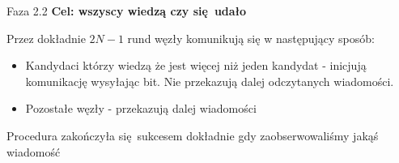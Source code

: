 \begin{frame}{Faza 2.2}
    \textbf{Cel: wszyscy wiedzą czy się udało} 

    \pause
    Przez dokładnie $2N-1$ rund węzły komunikują się w następujący sposób:
    \begin{itemize}
        \item Kandydaci którzy wiedzą że jest więcej niż jeden kandydat - inicjują komunikację wysyłając bit. Nie przekazują dalej odczytanych wiadomości.
        \item Pozostałe węzły - przekazują dalej wiadomości
    \end{itemize}
    \pause 
    Procedura zakończyła się sukcesem dokładnie gdy zaobserwowaliśmy jakąś wiadomość
\end{frame}